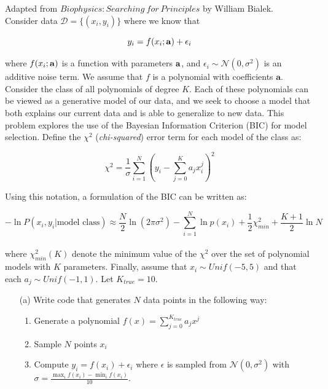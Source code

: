\documentclass[submit]{harvardml}
\begin{document}
\newpage
\begin{problem}

Adapted from $Biophysics: Searching\ for\ Principles$ by William Bialek.\\

\noindent Consider data $\mathcal{D} = \{(x_i, y_i)\}$ where we know that

    $$y_i = f(x_i ; \bold{a}) + \epsilon_i$$

\noindent where $f(x_i ; \bold{a})$ is a function with parameters $\bold{a}$, and $\epsilon_i \sim \mathcal{N}(0,\sigma^2)$ is an additive noise term.
We assume that $f$ is a polynomial with coefficients $\mathbf{a}$.
Consider the class of all polynomials of degree $K$. Each of these polynomials can be viewed as a generative model of our data, and we seek
to choose a model that both explains our current data and is able to generalize to new data. This problem explores the use of the Bayesian Information Criterion (BIC)
for model selection. Define the $\chi^2$ (\textit{chi-squared}) error term for each model of the class as:

$$\chi^2 =  \frac{1}{\sigma} \sum_{i=1}^N \left( y_i - \sum_{j=0}^K a_j x_i^j \right)^2 $$

\noindent Using this notation, a formulation of the BIC can be written as:

$$-\ln P({x_i,y_i} | \text{model class} ) \approx \frac{N}{2} \ln (2\pi \sigma^2) - \sum_{i=1}^N \ln p(x_i) + \frac{1}{2} \chi^2_{min} + \frac{K+1}{2} \ln N $$ \\

\noindent where $\chi^2_{min}(K)$ denote the minimum value of the $\chi^2$ over the set of polynomial models with $K$ parameters.
Finally, assume that $x_i \sim Unif(-5,5)$ and that each $a_j \sim Unif(-1,1)$. Let $K_{true} = 10$.

    \begin{itemize}

        \item[(a)] Write code that generates $N$ data points in the following way:
            \begin{enumerate}
                \item Generate a polynomial $f(x) = \sum_{j = 0}^{K_{true}} a_j x^j$
                \item Sample $N$ points $x_i$
                \item Compute $y_i = f(x_i) + \epsilon_i$ where $\epsilon$ is sampled from $\mathcal{N}(0, \sigma^2)$ with $\sigma = \frac{ \max_i f(x_i) - \min_i f(x_i) }{10}$.
            \end{enumerate}


\end{itemize}
\end{problem}
\end{document}
